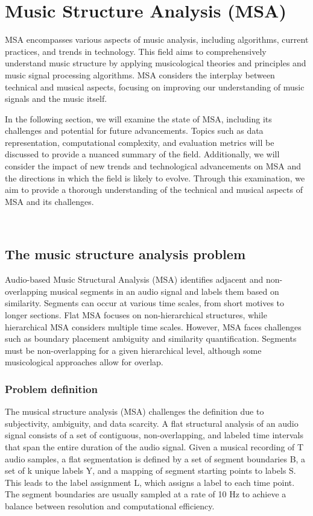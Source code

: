 \chapter{Music Structure Analysis (MSA)}

MSA encompasses various aspects of music analysis, including algorithms, current practices, and trends in technology. This field aims to comprehensively understand music structure by applying musicological theories and principles and music signal processing algorithms. MSA considers the interplay between technical and musical aspects, focusing on improving our understanding of music signals and the music itself.

In the following section, we will examine the state of MSA, including its challenges and potential for future advancements. Topics such as data representation, computational complexity, and evaluation metrics will be discussed to provide a nuanced summary of the field. Additionally, we will consider the impact of new trends and technological advancements on MSA and the directions in which the field is likely to evolve. Through this examination, we aim to provide a thorough understanding of the technical and musical aspects of MSA and its challenges.

~\cite{Nieto2020}~\cite{Chaki2021}

\section{The music structure analysis problem}

Audio-based Music Structural Analysis (MSA) identifies adjacent and non-overlapping musical segments in an audio signal and labels them based on similarity. Segments can occur at various time scales, from short motives to longer sections. Flat MSA focuses on non-hierarchical structures, while hierarchical MSA considers multiple time scales. However, MSA faces challenges such as boundary placement ambiguity and similarity quantification. Segments must be non-overlapping for a given hierarchical level, although some musicological approaches allow for overlap.

\subsection{Problem definition}

The musical structure analysis (MSA) challenges the definition due to subjectivity, ambiguity, and data scarcity. A flat structural analysis of an audio signal consists of a set of contiguous, non-overlapping, and labeled time intervals that span the entire duration of the audio signal. Given a musical recording of T audio samples, a flat segmentation is defined by a set of segment boundaries B, a set of k unique labels Y, and a mapping of segment starting points to labels S. This leads to the label assignment L, which assigns a label to each time point. The segment boundaries are usually sampled at a rate of 10 Hz to achieve a balance between resolution and computational efficiency.

